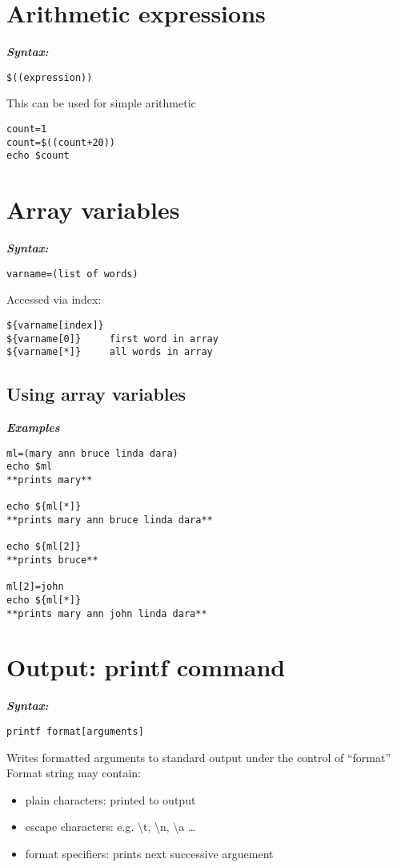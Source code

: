 \documentclass{report}
\begin{document}
\section{Arithmetic expressions}
\textit{\textbf{Syntax:}}
\begin{verbatim}
$((expression))
\end{verbatim}
This can be used for simple arithmetic
\begin{verbatim}
count=1
count=$((count+20))
echo $count
\end{verbatim}
\section{Array variables}
\textit{\textbf{Syntax:}}
\begin{verbatim}
varname=(list of words)
\end{verbatim}
Accessed via index:
\begin{verbatim}
${varname[index]}
${varname[0]}     first word in array
${varname[*]}     all words in array
\end{verbatim}
\subsection{Using array variables}
\textit{\textbf{Examples}}
\begin{verbatim}
ml=(mary ann bruce linda dara)
echo $ml
**prints mary**

echo ${ml[*]}
**prints mary ann bruce linda dara**

echo ${ml[2]}
**prints bruce**

ml[2]=john
echo ${ml[*]}
**prints mary ann john linda dara**
\end{verbatim}
\section{Output: printf command}
\textit{\textbf{Syntax:}}
\begin{verbatim}
printf format[arguments]
\end{verbatim}
Writes formatted arguments to standard output under the control of ``format''
\bigbreak \noindent
Format string may contain:
\begin{itemize}
  \item plain characters: printed to output 
  \item escape characters: e.g. \textbackslash t, \textbackslash n, \textbackslash a \ldots
  \item format specifiers: prints next successive arguement
\end{itemize}
\end{document}
